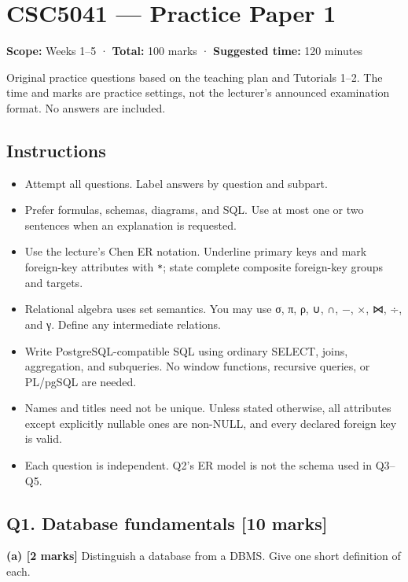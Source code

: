 \clearpage
\section{CSC5041 --- Practice Paper 1}\label{practice_paper_1}

\textbf{Scope:} Weeks 1--5 · \textbf{Total:} 100 marks · \textbf{Suggested time:} 120 minutes

Original practice questions based on the teaching plan and Tutorials 1--2. The time and marks are practice settings, not the lecturer's announced examination format. No answers are included.

\subsection{Instructions}\label{practice_paper_1-instructions}

\begin{itemize}
\tightlist
\item
  Attempt all questions. Label answers by question and subpart.
\item
  Prefer formulas, schemas, diagrams, and SQL. Use at most one or two sentences when an explanation is requested.
\item
  Use the lecture's Chen ER notation. Underline primary keys and mark foreign-key attributes with \texttt{*}; state complete composite foreign-key groups and targets.
\item
  Relational algebra uses set semantics. You may use σ, π, ρ, ∪, ∩, −, ×, ⋈, ÷, and γ. Define any intermediate relations.
\item
  Write PostgreSQL-compatible SQL using ordinary SELECT, joins, aggregation, and subqueries. No window functions, recursive queries, or PL/pgSQL are needed.
\item
  Names and titles need not be unique. Unless stated otherwise, all attributes except explicitly nullable ones are non-NULL, and every declared foreign key is valid.
\item
  Each question is independent. Q2's ER model is not the schema used in Q3--Q5.
\end{itemize}

\subsection{Q1. Database fundamentals {[}10 marks{]}}\label{practice_paper_1-q1.-database-fundamentals-10-marks}

\textbf{(a) {[}2 marks{]}} Distinguish a database from a DBMS. Give one short definition of each.

